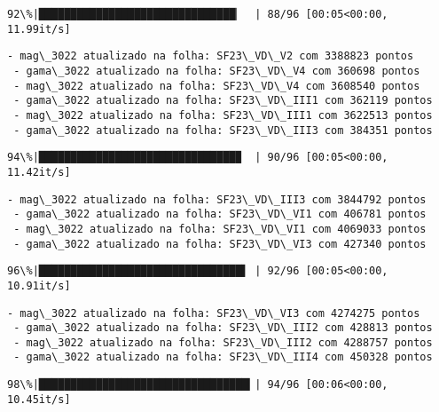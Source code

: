 \documentclass[11pt]{article}
\begin{document}
    \begin{Verbatim}[commandchars=\\\{\}]
 92\%|███████████████████████████████▏  | 88/96 [00:05<00:00, 11.99it/s]
    \end{Verbatim}

    \begin{Verbatim}[commandchars=\\\{\}]
 - mag\_3022 atualizado na folha: SF23\_VD\_V2 com 3388823 pontos
 - gama\_3022 atualizado na folha: SF23\_VD\_V4 com 360698 pontos
 - mag\_3022 atualizado na folha: SF23\_VD\_V4 com 3608540 pontos
 - gama\_3022 atualizado na folha: SF23\_VD\_III1 com 362119 pontos
 - mag\_3022 atualizado na folha: SF23\_VD\_III1 com 3622513 pontos
 - gama\_3022 atualizado na folha: SF23\_VD\_III3 com 384351 pontos
    \end{Verbatim}

    \begin{Verbatim}[commandchars=\\\{\}]
 94\%|███████████████████████████████▉  | 90/96 [00:05<00:00, 11.42it/s]
    \end{Verbatim}

    \begin{Verbatim}[commandchars=\\\{\}]
 - mag\_3022 atualizado na folha: SF23\_VD\_III3 com 3844792 pontos
 - gama\_3022 atualizado na folha: SF23\_VD\_VI1 com 406781 pontos
 - mag\_3022 atualizado na folha: SF23\_VD\_VI1 com 4069033 pontos
 - gama\_3022 atualizado na folha: SF23\_VD\_VI3 com 427340 pontos
    \end{Verbatim}

    \begin{Verbatim}[commandchars=\\\{\}]
 96\%|████████████████████████████████▌ | 92/96 [00:05<00:00, 10.91it/s]
    \end{Verbatim}

    \begin{Verbatim}[commandchars=\\\{\}]
 - mag\_3022 atualizado na folha: SF23\_VD\_VI3 com 4274275 pontos
 - gama\_3022 atualizado na folha: SF23\_VD\_III2 com 428813 pontos
 - mag\_3022 atualizado na folha: SF23\_VD\_III2 com 4288757 pontos
 - gama\_3022 atualizado na folha: SF23\_VD\_III4 com 450328 pontos
    \end{Verbatim}

    \begin{Verbatim}[commandchars=\\\{\}]
 98\%|█████████████████████████████████▎| 94/96 [00:06<00:00, 10.45it/s]
    \end{Verbatim}
\end{document}
